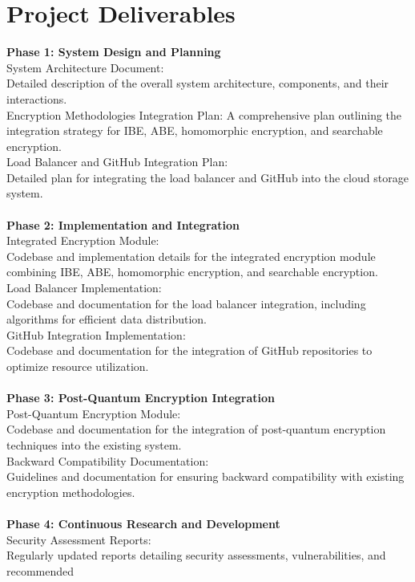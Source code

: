 \section{Project Deliverables}
\textbf{Phase 1: System Design and Planning}\\
System Architecture Document:\\
Detailed description of the overall system architecture, components, and their interactions.\\
Encryption Methodologies Integration Plan:
A comprehensive plan outlining the integration strategy for IBE, ABE, homomorphic encryption, and searchable encryption.\\
Load Balancer and GitHub Integration Plan:\\
Detailed plan for integrating the load balancer and GitHub into the cloud storage system.
\\
\\
\textbf{Phase 2: Implementation and Integration}\\
Integrated Encryption Module:\\
Codebase and implementation details for the integrated encryption module combining IBE, ABE, homomorphic encryption, and searchable encryption.\\
Load Balancer Implementation:\\
Codebase and documentation for the load balancer integration, including algorithms for efficient data
distribution.\\
GitHub Integration Implementation:\\
Codebase and documentation for the integration of GitHub repositories to optimize resource
utilization. 
\\
\\
\textbf{Phase 3: Post-Quantum Encryption Integration }\\
Post-Quantum Encryption Module:\\
Codebase and documentation for the integration of post-quantum encryption techniques into the existing system.\\
Backward Compatibility Documentation:\\
Guidelines and documentation for ensuring backward compatibility with existing encryption
methodologies. 
\\
\\
\textbf{Phase 4: Continuous Research and Development}\\
Security Assessment Reports:\\
Regularly updated reports detailing security assessments, vulnerabilities, and recommended
